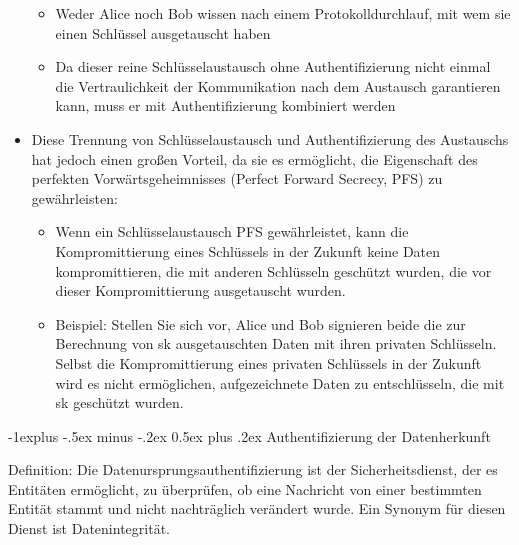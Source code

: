 \documentclass[a4paper]{article}
\makeatletter
\renewcommand{\subsection}{\@startsection{subsection}{2}{0mm}%
 {-1explus -.5ex minus -.2ex}%
 {0.5ex plus .2ex}%
 {\normalfont\normalsize\bfseries}}
\makeatother
\begin{document}
\begin{multicols}{3}
\begin{itemize}
              \begin{itemize}
                  \item
                        Weder Alice noch Bob wissen nach einem Protokolldurchlauf, mit wem
                        sie einen Schlüssel ausgetauscht haben
                  \item
                        Da dieser reine Schlüsselaustausch ohne Authentifizierung nicht
                        einmal die Vertraulichkeit der Kommunikation nach dem Austausch
                        garantieren kann, muss er mit Authentifizierung kombiniert werden
              \end{itemize}
        \item
              Diese Trennung von Schlüsselaustausch und Authentifizierung des
              Austauschs hat jedoch einen großen Vorteil, da sie es ermöglicht, die
              Eigenschaft des perfekten Vorwärtsgeheimnisses (Perfect Forward
              Secrecy, PFS) zu gewährleisten:

              \begin{itemize}
                  \item
                        Wenn ein Schlüsselaustausch PFS gewährleistet, kann die
                        Kompromittierung eines Schlüssels in der Zukunft keine Daten
                        kompromittieren, die mit anderen Schlüsseln geschützt wurden, die
                        vor dieser Kompromittierung ausgetauscht wurden.
                  \item
                        Beispiel: Stellen Sie sich vor, Alice und Bob signieren beide die
                        zur Berechnung von sk ausgetauschten Daten mit ihren privaten
                        Schlüsseln. Selbst die Kompromittierung eines privaten Schlüssels in
                        der Zukunft wird es nicht ermöglichen, aufgezeichnete Daten zu
                        entschlüsseln, die mit sk geschützt wurden.
              \end{itemize}
    \end{itemize}


    \subsection{Authentifizierung der
        Datenherkunft}

    Definition: Die Datenursprungsauthentifizierung ist der
    Sicherheitsdienst, der es Entitäten ermöglicht, zu überprüfen, ob eine
    Nachricht von einer bestimmten Entität stammt und nicht nachträglich
    verändert wurde. Ein Synonym für diesen Dienst ist Datenintegrität.


\end{multicols}
\end{document}
